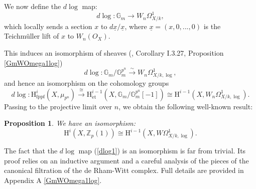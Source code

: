 \documentclass[a4paper,12pt,twoside]{report}
\newtheorem{proposition}[theorem]{Proposition}
\newtheorem{remark}[theorem]{Remark}
\newcommand{\Z}{\mathbb{Z}}
\newcommand{\G}{\mathbb{G}}
\newcommand{\fppf}{\mathrm{fppf}}
\newcommand{\et}{\mathrm{\acute{e}t}}
\newcommand{\HH}{\mathrm{H}}
\begin{document}
We now define the $d \log$ map: 
\begin{equation}
    d\log\colon \G_m \rightarrow W_n\Omega_{X/k}^1, 
\end{equation} 
which locally sends a section $x$ to $d\underline{x}/\underline{x}$, 
where $\underline{x}=(x,0,...,0)$ is the Teichm\"uller lift of $x$ to $W_n(O_X)$. 

This induces an isomorphism of sheaves (\cite{Il1}, Corollary I.3.27, Proposition \ref{GmWOmega1log})
\begin{equation}\label{dlog1}
    d\log: \G_m/\G_m^{p^n} \stackrel{\sim}\longrightarrow W_n\Omega_{X/k,\log}^1,
\end{equation} 
and hence an isomorphism on the cohomology groups
\begin{equation*}
    d\log: \HH^i_{\fppf}(X,\mu_{p^n})\xrightarrow[]{\cong} \HH^{i-1}_{\et}(X, \G_m/\G_m^{p^n}[-1]) \cong \HH^{i-1}(X,W_n\Omega^1_{X/k,\log}).
\end{equation*}
Passing to the projective limit over $n$, we obtain the following well-known result:

\begin{proposition}\label{log}
    We have an isomorphism: 
    \begin{equation}
        \HH^i(X,\Z_p(1))\cong \HH^{i-1}(X,W\Omega^{1}_{X/k,\log}).
    \end{equation}    
\end{proposition}

The fact that the \(d\log\) map (\ref{dlog1}) is an isomorphism is far from trivial. 
Its proof relies on an inductive argument and a careful analysis 
of the pieces of the canonical filtration of the de Rham-Witt complex. 
Full details are provided in Appendix A \ref{GmWOmega1log}.  


%
\end{document}
